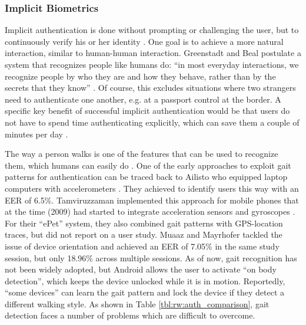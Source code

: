 	\subsubsection{Implicit Biometrics}
	Implicit authentication is done without prompting or challenging the user, but to continuously verify his or her identity \cite{Peisert2013PriciplesAuthentication}. One goal is to achieve a more natural interaction, similar to human-human interaction. Greenstadt and Beal postulate a system that recognizes people like humans do: ``in most everyday interactions, we recognize people by who they are and how they behave, rather than by the secrets that they know'' \cite{Greenstadt2008CognitiveSecurity}. Of course, this excludes situations where two strangers need to authenticate one another, e.g. at a passport control at the border. A specific key benefit of successful implicit authentication would be that users do not have to spend time authenticating explicitly, which can save them a couple of minutes per day \cite{Harbach2016HardLockLife}. 
	
	The way a person walks is one of the features that can be used to recognize them, which humans can easily do \cite{Cutting1977GaitPerception}. One of the early approaches to exploit gait patterns for authentication can be traced back to Ailisto \etal who equipped laptop computers with accelerometers \cite{Ailisto2005GaitPatternAccelerometers}. They achieved to identify users this way with an EER of 6.5\%.  Tamviruzzaman \etal implemented this approach for mobile phones that at the time (2009) had started to integrate acceleration sensors and gyroscopes \cite{Tamviruzzaman2009ePet}. For their ``ePet'' system, they also combined gait patterns with GPS-location traces, but did not report on a user study. Muaaz and Mayrhofer tackled the issue of device orientation and achieved an EER of 7.05\% in the same study session, but only 18.96\% across multiple sessions. As of now, gait recognition has not been widely adopted, but Android allows the user to activate ``on body detection'', which keeps the device unlocked while it is in motion. Reportedly, ``some devices'' can learn the gait pattern and lock the device if they detect a different walking style. As shown in Table \ref{tbl:rw:auth_comparison}, gait detection faces a number of problems which are difficult to overcome. 
	
